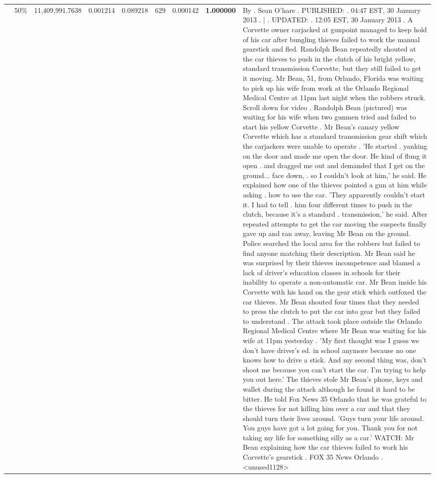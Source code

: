 \begin{table}[H]
\begin{tabular}{llrrrrrrl}
 & 50\% & 11,409,991.7638 & 0.001214 & 0.089218 & \color{red} 629 & 0.000142 & \bfseries \color{red} 1.000000 & By . Sean O'hare . PUBLISHED: . 04:47 EST, 30 January 2013 . | . UPDATED: . 12:05 EST, 30 January 2013 . A Corvette owner carjacked at gunpoint managed to keep hold of his car after bungling thieves failed to work the manual gearstick and fled. Randolph Bean repeatedly shouted at the car thieves to push in the clutch of his bright yellow, standard transmission Corvette, but they still failed to get it moving. Mr Bean, 51, from Orlando, Florida was waiting to pick up his wife from work at the Orlando Regional Medical Centre at 11pm last night when the robbers struck. Scroll down for video . Randolph Bean (pictured) was waiting for his wife when two gunmen tried and failed to start his yellow Corvette . Mr Bean's canary yellow Corvette which has a standard transmission gear shift which the carjackers were unable to operate . 'He started . yanking on the door and made me open the door. He kind of flung it open . and dragged me out and demanded that I get on the ground... face down, . so I couldn't look at him,' he said. He explained how one of the thieves pointed a gun at him while asking . how to use the car. 'They apparently couldn't start it. I had to tell . him four different times to push in the clutch, because it's a standard . transmission,' he said. After repeated attempts to get the car moving the suspects finally gave up and ran away, leaving Mr Bean on the ground. Police searched the local area for the robbers but failed to find anyone matching their description. Mr Bean said he was surprised by their thieves incompetence and blamed a lack of driver's education classes in schools for their inability to operate a non-automatic car. Mr Bean inside his Corvette with his hand on the gear stick which outfoxed the car thieves. Mr Bean shouted four times that they needed to press the clutch to put the car into gear but they failed to understand . The attack took place outside the Orlando Regional Medical Centre where Mr Bean was waiting for his wife at 11pm yesterday . 'My first thought was I guess we don't have driver's ed. in school anymore because no one knows how to drive a stick. And my second thing was, don't shoot me because you can't start the car. I'm trying to help you out here.' The thieves stole Mr Bean's phone, keys and wallet during the attack although he found it hard to be bitter. He told Fox News 35 Orlando that he was grateful to the thieves for not killing him over a car and that they should turn their lives around. 'Guys turn your life around. You guys have got a lot going for you. Thank you for not taking my life for something silly as a car.' WATCH: Mr Bean explaining how the car thieves failed to work his Corvette's gearstick . FOX 35 News Orlando .<unused1128> \\

\end{tabular}
\end{table}
